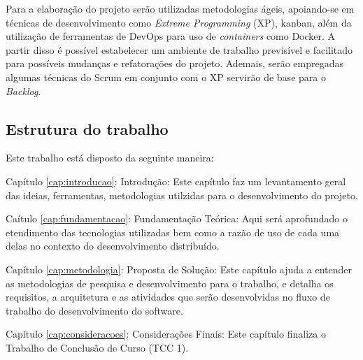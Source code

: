 Para a elaboração do projeto serão utilizadas metodologias ágeis, apoiando-se em técnicas de desenvolvimento como \textit{Extreme Programming} (XP), kanban, além da utilização de ferramentas de DevOps para uso de \textit{containers} como Docker. A partir disso é possível estabelecer um ambiente de trabalho previsível e facilitado para possíveis mudanças e refatorações do projeto. Ademais, serão empregadas algumas técnicas do Scrum em conjunto com o XP servirão de base para o \textit{Backlog}.

\subsection{Estrutura do trabalho}

Este trabalho está disposto da seguinte maneira:

Capítulo \ref{cap:introducao}: Introdução: Este capítulo faz um levantamento geral das ideias, ferramentas, metodologias utilzidas para o desenvolvimento do projeto.

Caítulo \ref{cap:fundamentacao}: Fundamentação Teórica: Aqui será aprofundado o etendimento das tecnologias utilizadas bem como a razão de uso de cada uma delas no contexto do desenvolvimento distribuído.

Capítulo \ref{cap:metodologia}: Proposta de Solução: Este capítulo ajuda a entender as metodologias de pesquisa e desenvolvimento para o trabalho, e detalha os requisitos, a arquitetura e as atividades que serão desenvolvidas no fluxo de trabalho do desenvolvimento do software.

Capítulo \ref{cap:consideracoes}: Considerações Finais: Este capítulo finaliza o Trabalho de Conclusão de Curso (TCC 1).